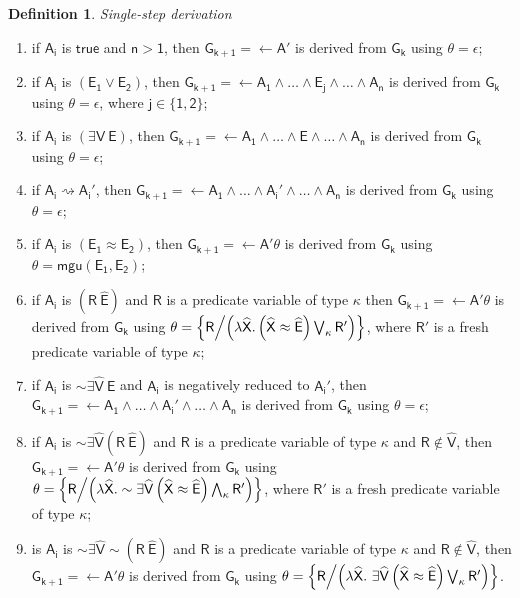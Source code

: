 \documentclass[inscr,ack,preface]{dithesis}
\theoremstyle{definition}
\newtheorem{definition}{Definition}[]
\newcommand{\msf}[1]{$\mathsf{#1}$}
\begin{document}
\begin{definition}{\emph{Single-step derivation}}
\begin{enumerate}
  \item if \msf{A_i} is \msf{true} and \msf{n > 1},
        then \msf{G_{k+1} = \leftarrow A'} is derived from \msf{G_k}
        using \msf{\theta = \epsilon};
  \item if \msf{A_i} is \msf{\left( E_1 \lor E_2 \right)},
        then \msf{G_{k+1} = \leftarrow A_1 \land \dots \land E_j \land \dots \land A_n} is derived from \msf{G_k}
        using \msf{\theta = \epsilon}, where \msf{j \in \{1,2\}};
  \item if \msf{A_i} is \msf{\left( \exists V ~ E \right)},
        then \msf{G_{k+1} = \leftarrow A_1 \land \dots \land E \land \dots \land A_n} is derived from \msf{G_k} using \msf{\theta = \epsilon};
  \item if \msf{A_i \rightsquigarrow A_i'},
        then \msf{G_{k+1} = \leftarrow A_1 \land \dots \land A_i' \land \dots \land A_n} is derived from \msf{G_k} using \msf{\theta = \epsilon};
  \item if \msf{A_i} is \msf{\left( E_1 \approx E_2 \right)},
        then \msf{G_{k+1} = \leftarrow A' \theta} is derived from \msf{G_k} using \msf{\theta = mgu \left( E_1, E_2 \right)};
  \item if \msf{A_i} is \msf{\left( R ~ \widehat{E} \right)}
        and \msf{R} is a predicate variable of type \msf{\kappa}
        then \msf{G_{k+1} = \leftarrow A' \theta} is derived from \msf{G_k}
        using \msf{\theta = \left\{ R \middle/ \left( \lambda \widehat{X} . \left( \widehat{X} \approx \widehat{E} \right) \bigvee_{\kappa} R' \right) \right\}},
        where \msf{R'} is a fresh predicate variable of type \msf{\kappa};
  \item if \msf{A_i} is \msf{\sim \exists \widehat{V} ~ E}
        and \msf{A_i} is negatively reduced to \msf{A_i'},
        then \msf{G_{k+1} = \leftarrow A_1 \land \dots \land A_i' \land \dots \land A_n} is derived from \msf{G_k} using \msf{\theta = \epsilon};
  \item if \msf{A_i} is \msf{\sim \exists \widehat{V} \left( R ~ \widehat{E} \right)}
        and \msf{R} is a predicate variable of type \msf{\kappa}
        and \msf{R \not\in \widehat{V}},
        then \msf{G_{k+1} = \leftarrow A' \theta} is derived from \msf{G_k}
        using \msf{\theta = \left\{ R \middle/ \left( \lambda \widehat{X} . \sim \exists \widehat{V} \left( \widehat{X} \approx \widehat{E} \right) \bigwedge_{\kappa} R' \right) \right\}},
        where \msf{R'} is a fresh predicate variable of type \msf{\kappa};
  \item is \msf{A_i} is \msf{\sim \exists \widehat{V} \sim \left( R ~ \widehat{E} \right)}
        and \msf{R} is a predicate variable of type \msf{\kappa}
        and \msf{R \not\in \widehat{V}},
        then \msf{G_{k+1} = \leftarrow A' \theta} is derived from \msf{G_k}
        using \msf{\theta = \left\{ R \middle/ \left( \lambda \widehat{X} . ~ \exists \widehat{V} \left( \widehat{X} \approx \widehat{E} \right) \bigvee_{\kappa} R' \right) \right\}}.
\end{enumerate}

\end{definition}
\end{document}
